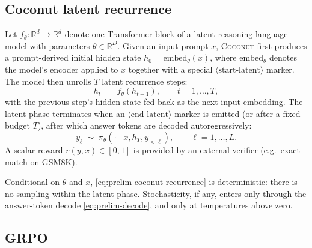 \documentclass[11pt]{article}
\theoremstyle{definition}
\theoremstyle{remark}
\newcommand{\R}{\mathbb{R}}
\begin{document}
\subsection{Coconut latent recurrence}
\label{sec:prelim-coconut}

Let $f_\theta : \R^d \to \R^d$ denote one Transformer block of a
latent-reasoning language model with parameters $\theta \in \R^D$.
Given an input prompt $x$, \textsc{Coconut} first produces a
prompt-derived initial hidden state $h_0 = \mathrm{embed}_\theta(x)$,
where $\mathrm{embed}_\theta$ denotes the model's encoder applied to
$x$ together with a special $\langle\text{start-latent}\rangle$ marker.
The model then unrolls $T$ latent recurrence steps:
\begin{equation}
h_t \;=\; f_\theta(h_{t-1}),
\qquad t = 1, \dots, T,
\label{eq:prelim-coconut-recurrence}
\end{equation}
with the previous step's hidden state fed back as the next input
embedding.  The latent phase terminates when an
$\langle\text{end-latent}\rangle$ marker is emitted (or after a fixed
budget $T$), after which answer tokens are decoded autoregressively:
\begin{equation}
y_\ell \;\sim\; \pi_\theta(\cdot \mid x, h_T, y_{<\ell}),
\qquad \ell = 1, \dots, L.
\label{eq:prelim-decode}
\end{equation}
A scalar reward $r(y, x) \in [0, 1]$ is provided by an external
verifier (e.g.\ exact-match on \textsc{GSM8K}).

Conditional on $\theta$ and $x$, \eqref{eq:prelim-coconut-recurrence}
is deterministic: there is no sampling within the latent phase.
Stochasticity, if any, enters only through the answer-token decode
\eqref{eq:prelim-decode}, and only at temperatures above zero.

\subsection{GRPO}
\label{sec:prelim-grpo}
\end{document}
